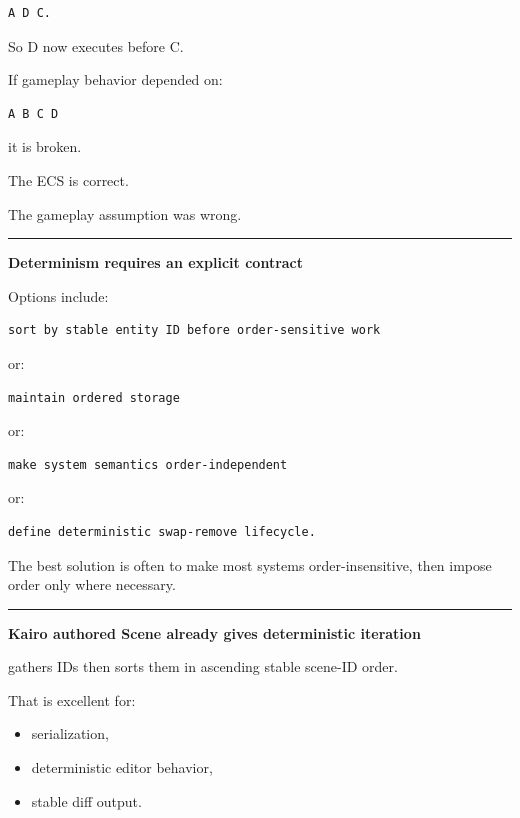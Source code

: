 \begin{verbatim}
A D C.
\end{verbatim}

So D now executes before C.

If gameplay behavior depended on:

\begin{verbatim}
A B C D
\end{verbatim}

it is broken.

The ECS is correct.

The gameplay assumption was wrong.

\begin{center}\rule{0.5\linewidth}{0.5pt}\end{center}

\textbf{Determinism requires an explicit contract}

Options include:

\begin{verbatim}
sort by stable entity ID before order-sensitive work
\end{verbatim}

or:

\begin{verbatim}
maintain ordered storage
\end{verbatim}

or:

\begin{verbatim}
make system semantics order-independent
\end{verbatim}

or:

\begin{verbatim}
define deterministic swap-remove lifecycle.
\end{verbatim}

The best solution is often to make most systems order-insensitive, then impose order only where necessary.

\begin{center}\rule{0.5\linewidth}{0.5pt}\end{center}

\textbf{Kairo authored Scene already gives deterministic iteration}

 gathers IDs then sorts them in ascending stable scene-ID order.

That is excellent for:

\begin{itemize}
\tightlist
\item
  serialization,
\item
  deterministic editor behavior,
\item
  stable diff output.
\end{itemize}

